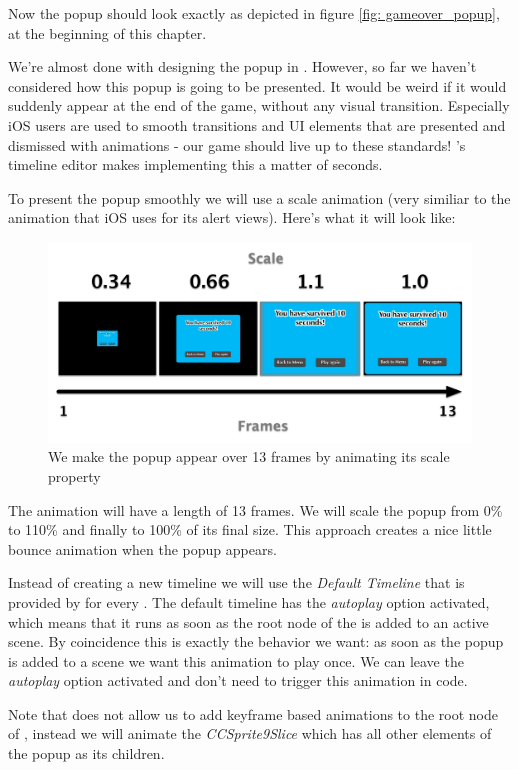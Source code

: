 Now the popup should look exactly as depicted in figure \ref{fig:
gameover_popup}, at the beginning of this chapter.

We're almost done with designing the popup in \SB{}. However, so far we haven't
considered how this popup is going to be presented. It would be weird if it
would suddenly appear at the end of the game, without any visual transition.
Especially iOS users are used to smooth transitions and UI elements that are
presented and dismissed with animations - our game should live up to these
standards! \SB{}'s timeline editor makes implementing this a matter of seconds.

To present the popup smoothly we will use a scale animation (very similiar to
the animation that iOS uses for its alert views). Here's what it will look like:

\begin{figure}[H]
    \centering
    \includegraphics[width=0.75\linewidth]{images/Chapter7/popup_animation.png}
    \caption{We make the popup appear over 13 frames by animating its scale
    property}\label{fig: animate_gamover_popup}
\end{figure}

The animation will have a length of 13 frames. We will scale the popup from 0\%
to 110\% and finally to 100\% of its final size. This approach creates a nice
little bounce animation when the popup appears.

Instead of creating a new timeline we will use the \textit{Default Timeline}
that is provided by \SB{} for every \ccbfile{}. The default timeline has the
\textit{autoplay} option activated, which means that it runs as soon as the root
node of the \ccbfile{} is added to an active scene. By coincidence this is exactly
the behavior we want: as soon as the popup is added to a scene we want this
animation to play once. We can leave the \textit{autoplay} option activated and
don't need to trigger this animation in code.

Note that \SB{} does not allow us to add keyframe based animations to the root
node of \ccbfile{}, instead we will animate the \textit{CCSprite9Slice} which
has all other elements of the popup as its children.

